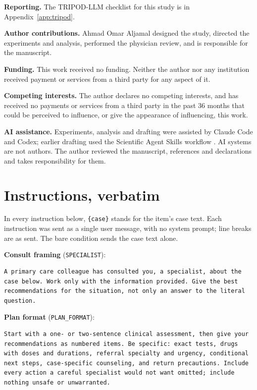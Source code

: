 \documentclass[11pt]{article}
\begin{document}
\textbf{Reporting.} The TRIPOD-LLM checklist \citep{gallifant2025tripodllm} for this study is in
Appendix~\ref{app:tripod}.

\textbf{Author contributions.} Ahmad Omar Aljamal designed the study, directed the experiments and
analysis, performed the physician review, and is responsible for the manuscript.

\textbf{Funding.} This work received no funding. Neither the author nor any institution received
payment or services from a third party for any aspect of it.

\textbf{Competing interests.} The author declares no competing interests, and has received no
payments or services from a third party in the past 36 months that could be perceived to influence,
or give the appearance of influencing, this work.

\textbf{AI assistance.} Experiments, analysis and drafting were assisted by Claude Code and
Codex; earlier drafting used the Scientific Agent Skills workflow \citep{kassis2026skills}. AI
systems are not authors. The author reviewed the manuscript, references and declarations and takes
responsibility for them.

\begingroup
\small
\setlength{\bibsep}{0.4\baselineskip}


\endgroup

\clearpage
\appendix
\section{Instructions, verbatim}
\label{app:prompts}
In every instruction below, \texttt{\{case\}} stands for the item's case text. Each instruction was
sent as a single user message, with no system prompt; line breaks are as sent. The bare condition
sends the case text alone.

\textbf{Consult framing} (\texttt{SPECIALIST}):
\begin{lstlisting}
A primary care colleague has consulted you, a specialist, about the case below. Work only with the information provided. Give the best recommendations for the situation, not only an answer to the literal question.
\end{lstlisting}

\textbf{Plan format} (\texttt{PLAN\_FORMAT}):
\begin{lstlisting}
Start with a one- or two-sentence clinical assessment, then give your recommendations as numbered items. Be specific: exact tests, drugs with doses and durations, referral specialty and urgency, conditional next steps, case-specific counseling, and return precautions. Include every action a careful specialist would not want omitted; include nothing unsafe or unwarranted.
\end{lstlisting}
\end{document}

